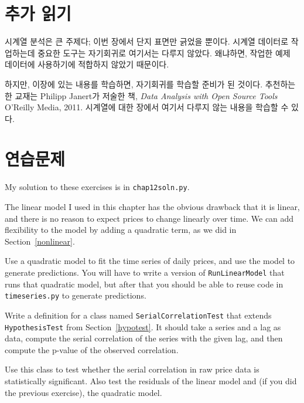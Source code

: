 \section{추가 읽기}
시계열 분석은 큰 주제다; 이번 장에서 단지 표면만 긁었을 뿐이다.
시계열 데이터로 작업하는데 중요한 도구는 자기회귀로 여기서는 다루지 않았다. 왜냐하면, 작업한 예제 데이터에 사용하기에 적합하지 않았기 때문이다.

하지만, 이장에 있는 내용를 학습하면, 자기회귀를 학습할 준비가 된 것이다. 추천하는 한 교재는 Philipp Janert가 저술한 책, {\it Data Analysis with Open Source Tools} O'Reilly Media, 2011. 
시계열에 대한 장에서 여기서 다루지 않는 내용을 학습할 수 있다.


\section{연습문제}

My solution to these exercises is in \verb"chap12soln.py".

\begin{exercise}
The linear model I used in this chapter has the obvious drawback
that it is linear, and there is no reason to expect prices to
change linearly over time.
We can add flexibility to the model by adding a quadratic term,
as we did in Section~\ref{nonlinear}.  

Use a quadratic model to fit the time series of daily prices,
and use the model to generate predictions.  You will have to
write a version of {\tt RunLinearModel} that runs that quadratic
model, but after that you should be able to reuse code in
{\tt timeseries.py} to generate predictions.

\end{exercise}

\begin{exercise}
Write a definition for a class named {\tt SerialCorrelationTest}
that extends {\tt HypothesisTest} from Section~\ref{hypotest}.
It should take a series and a lag as data, compute the serial
correlation of the series with the given lag, and then compute
the p-value of the observed correlation.

Use this class to test whether the serial correlation in raw
price data is statistically significant.  Also test the residuals
of the linear model and (if you did the previous exercise),
the quadratic model.
   

\end{exercise}

